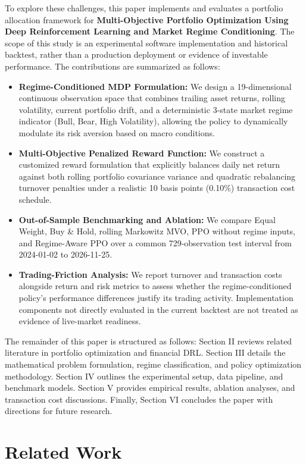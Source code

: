 \documentclass[conference]{IEEEtran}
\begin{document}
To explore these challenges, this paper implements and evaluates a portfolio allocation framework for \textbf{Multi-Objective Portfolio Optimization Using Deep Reinforcement Learning and Market Regime Conditioning}. The scope of this study is an experimental software implementation and historical backtest, rather than a production deployment or evidence of investable performance. The contributions are summarized as follows:
\begin{itemize}
    \item \textbf{Regime-Conditioned MDP Formulation:} We design a 19-dimensional continuous observation space that combines trailing asset returns, rolling volatility, current portfolio drift, and a deterministic 3-state market regime indicator (Bull, Bear, High Volatility), allowing the policy to dynamically modulate its risk aversion based on macro conditions.
    \item \textbf{Multi-Objective Penalized Reward Function:} We construct a customized reward formulation that explicitly balances daily net return against both rolling portfolio covariance variance and quadratic rebalancing turnover penalties under a realistic 10 basis points (0.10\%) transaction cost schedule.
    \item \textbf{Out-of-Sample Benchmarking and Ablation:} We compare Equal Weight, Buy \& Hold, rolling Markowitz MVO, PPO without regime inputs, and Regime-Aware PPO over a common 729-observation test interval from 2024-01-02 to 2026-11-25.
    \item \textbf{Trading-Friction Analysis:} We report turnover and transaction costs alongside return and risk metrics to assess whether the regime-conditioned policy's performance differences justify its trading activity. Implementation components not directly evaluated in the current backtest are not treated as evidence of live-market readiness.
\end{itemize}

The remainder of this paper is structured as follows: Section II reviews related literature in portfolio optimization and financial DRL. Section III details the mathematical problem formulation, regime classification, and policy optimization methodology. Section IV outlines the experimental setup, data pipeline, and benchmark models. Section V provides empirical results, ablation analyses, and transaction cost discussions. Finally, Section VI concludes the paper with directions for future research.

\section{Related Work}
\end{document}
